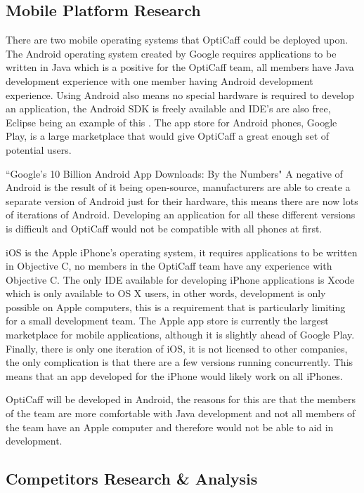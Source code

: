 \subsection{Mobile Platform Research}
There are two mobile operating systems that OptiCaff could be deployed upon. The Android operating system created by Google requires applications to be written in Java which is a positive for the OptiCaff team, all members have Java development experience with one member having Android development experience. Using Android also means no special hardware is required to develop an application, the Android SDK is freely available and IDE’s are also free, Eclipse being an example of this \cite{Eclipse}. The app store for Android phones, Google Play, is a large marketplace that would give OptiCaff a great enough set of potential users.

``Google’s 10 Billion Android App Downloads: By the Numbers" \newline
A negative of Android is the result of it being open-source, manufacturers are able to create a separate version of Android just for their hardware, this means there are now lots of iterations of Android. Developing an application for all these different versions is difficult and OptiCaff would not be compatible with all phones at first.

iOS is the Apple iPhone’s operating system, it requires applications to be written in Objective C, no members in the OptiCaff team have any experience with Objective C. The only IDE available for developing iPhone applications is Xcode which is only available to OS X users, in other words, development is only possible on Apple computers, this is a requirement that is particularly limiting for a small development team. The Apple app store is currently the largest marketplace for mobile applications, although it is slightly ahead of Google Play. Finally, there is only one iteration of iOS, it is not licensed to other companies, the only complication is that there are a few versions running concurrently. This means that an app developed for the iPhone would likely work on all iPhones.

OptiCaff will be developed in Android, the reasons for this are that the members of the team are more comfortable with Java development and not all members of the team have an Apple computer and therefore would not be able to aid in development.

\subsection{Competitors Research \& Analysis}
\label{sec:Competitors}

